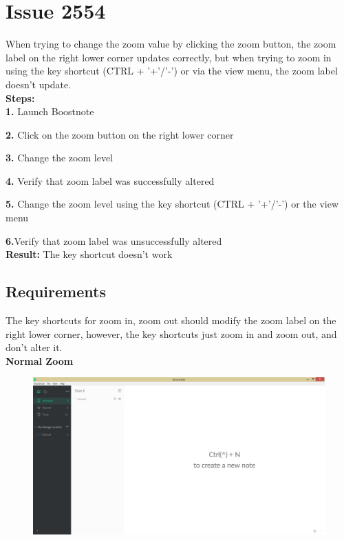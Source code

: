 \documentclass[main.tex]{subfiles}
\begin{document}
\section{Issue 2554}

When trying to change the zoom value by clicking the zoom button, the zoom label on the right lower corner updates correctly, but when trying to zoom in using the key shortcut (CTRL + '+'/'-') or via the view menu, the zoom label doesn't update.\\

\textbf{Steps:}\\

\textbf{1.} Launch Boostnote

\textbf{2.} Click on the zoom button on the right lower corner

\textbf{3.} Change the zoom level

\textbf{4.} Verify that zoom label was successfully altered

\textbf{5.} Change the zoom level using the key shortcut (CTRL + '+'/'-') or the view menu

\textbf{6.}Verify that zoom label was unsuccessfully altered\\

\textbf{Result:} The key shortcut doesn't work

\subsection{Requirements}

The key shortcuts for zoom in, zoom out should modify the zoom label on the right lower corner, however, the key shortcuts just zoom in and zoom out, and don't alter it.\\

\textbf{Normal Zoom}\\

\begin{figure}[h]
\includegraphics[scale=0.2]{images/normalZoom.png}
\centering
\end{figure}
\clearpage
\end{document}
